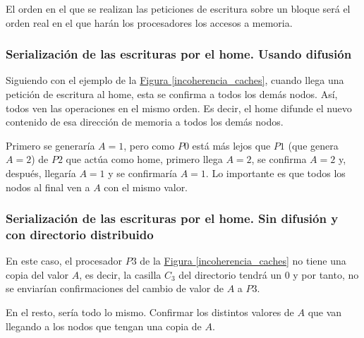 \documentclass[10pt,a4paper,spanish]{report}
\begin{document}
El orden en el que se realizan las peticiones de escritura sobre un bloque será el orden real en el que harán los procesadores los accesos a memoria.

\textcolor[rgb]{0.2,0.4,0.8}{\subsubsection{Serialización de las escrituras por el home. Usando difusión}}
Siguiendo con el ejemplo de la \hyperref[incoherencia_caches]{Figura \ref*{incoherencia_caches}}, cuando llega una petición de escritura al home, esta se confirma a todos los demás nodos. Así, todos ven las operaciones en el mismo orden. Es decir, el home difunde el nuevo contenido de esa dirección de memoria a todos los demás nodos.

Primero se generaría $A=1$, pero como $P0$ está más lejos que $P1$ (que genera $A=2$) de $P2$ que actúa como home, primero llega $A=2$, se confirma $A=2$ y, después, llegaría $A=1$ y se confirmaría $A=1$. Lo importante es que todos los nodos al final ven a $A$ con el mismo valor.

\textcolor[rgb]{0.2,0.4,0.8}{\subsubsection{Serialización de las escrituras por el home. Sin difusión y con directorio distribuido}}
En este caso, el procesador $P3$ de la \hyperref[incoherencia_caches]{Figura \ref*{incoherencia_caches}} no tiene una copia del valor $A$, es decir, la casilla $C_3$ del directorio tendrá un $0$ y por tanto, no se enviarían confirmaciones del cambio de valor de $A$ a $P3$. 

En el resto, sería todo lo mismo. Confirmar los distintos valores de $A$ que van llegando a los nodos que tengan una copia de $A$.
\end{document}
